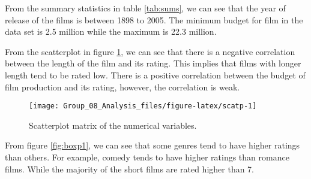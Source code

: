\documentclass[
]{article}
\begin{document}
From the summary statistics in table \ref{tab:sums}, we can see that the
year of release of the films is between 1898 to 2005. The minimum budget
for film in the data set is 2.5 million while the maximum is 22.3
million.

\begin{table}[!h]

\caption{\label{tab:expl4}\label{tab:sums} Summary statistics of the numerical variables}
\centering
{}
\end{table}

From the scatterplot in figure \ref{fig:scatp}, we can see that there is
a negative correlation between the length of the film and its rating.
This implies that films with longer length tend to be rated low. There
is a positive correlation between the budget of film production and its
rating, however, the correlation is weak.

\begin{figure}[H]

{\centering \texttt{[image: Group\_08\_Analysis\_files/figure-latex/scatp-1]} 

}

\caption{\label{fig:scatp} Scatterplot matrix of the numerical variables.}\label{fig:scatp}
\end{figure}

From figure \ref{fig:boxp1}, we can see that some genres tend to have
higher ratings than others. For example, comedy tends to have higher
ratings than romance films. While the majority of the short films are
rated higher than 7.
\end{document}

